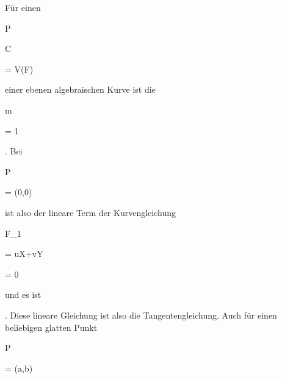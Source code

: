 {


Für einen


\mavergleichskette

{\vergleichskette

{P
}

{ \in }{ C
}

{ = }{ V(F)
}

{    }{
}

{   }{
}

}
{}{}{}
einer ebenen algebraischen Kurve ist die


\mavergleichskette

{\vergleichskette

{m
}

{ = }{ 1
}

{  }{
}

{    }{
}

{   }{
}

}
{}{}{.}
Bei


\mavergleichskette

{\vergleichskette

{P
}

{ = }{ (0,0)
}

{  }{
}

{    }{
}

{   }{
}

}
{}{}{}
ist also der lineare Term der Kurvengleichung


\mavergleichskette

{\vergleichskette

{ F_1
}

{ = }{ uX+vY
}

{ = }{ 0
}

{    }{
}

{   }{
}

}
{}{}{}
und es ist


 {  }


 {} {.}
Diese lineare Gleichung ist also die Tangentengleichung. Auch für einen beliebigen glatten Punkt


\mavergleichskette

{\vergleichskette

{P
}

{ = }{(a,b)
}

}}
